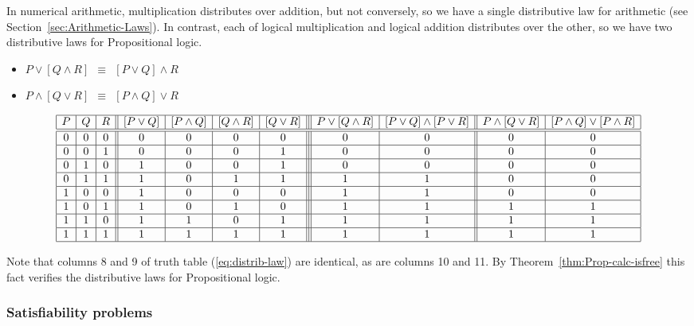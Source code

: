 \noindent
In numerical arithmetic, multiplication distributes over addition, but
not conversely, so we have a single distributive law for arithmetic
(see Section~\ref{sec:Arithmetic-Laws}).  In contrast, each of logical
multiplication and logical addition distributes over the other, so we
have two distributive laws for Propositional logic.
\begin{itemize}
\item
$ P \vee [ Q \wedge R] \ \ \equiv \ \ [P \vee Q] \wedge R$
\item
$P \wedge [ Q \vee R] \ \ \equiv \ \ [P \wedge Q] \vee R$
\end{itemize}
{\small
\begin{equation}
\label{eq:distrib-law}
\begin{array}{|c|c|c||c|c|c|c|||c|c||c|c|}
\hline
P & Q & R
  & [P \vee Q]
  & [P \wedge Q]
  & [Q \wedge R] 
  & [Q \vee R] 
  & P \vee [ Q \wedge R]
  & [P \vee Q] \wedge [P \vee R]
  & P \wedge [ Q \vee R]
  & [P \wedge Q] \vee [P \wedge R] \\
\hline
\hline
0 & 0 & 0
  & 0
  & 0
  & 0
  & 0
  & 0
  & 0
  & 0
  & 0 \\ 
\hline
0 & 0 & 1
  & 0
  & 0
  & 0
  & 1
  & 0
  & 0
  & 0 
  & 0 \\
\hline
0 & 1 & 0
  & 1
  & 0
  & 0
  & 1
  & 0
  & 0
  & 0
  & 0 \\
\hline
0 & 1 & 1
  & 1
  & 0
  & 1
  & 1
  & 1
  & 1
  & 0
  & 0 \\
\hline
1 & 0 & 0
  & 1
  & 0
  & 0
  & 0
  & 1
  & 1
  & 0
  & 0 \\
\hline
1 & 0 & 1
  & 1
  & 0
  & 1
  & 0
  & 1
  & 1
  & 1
  & 1 \\
\hline
1 & 1 & 0
  & 1
  & 1
  & 0
  & 1
  & 1
  & 1
  & 1
  & 1 \\
\hline
1 & 1 & 1
  & 1
  & 1
  & 1
  & 1
  & 1
  & 1
  & 1
  & 1 \\
\hline
\end{array}
\end{equation}
}

Note that columns 8 and 9 of truth table (\ref{eq:distrib-law}) are
identical, as are columns 10 and 11.  By
Theorem~\ref{thm:Prop-calc-isfree} this fact verifies the distributive
laws for Propositional logic.

\subsubsection{Satisfiability problems}
\label{sec:Satisfiability}

